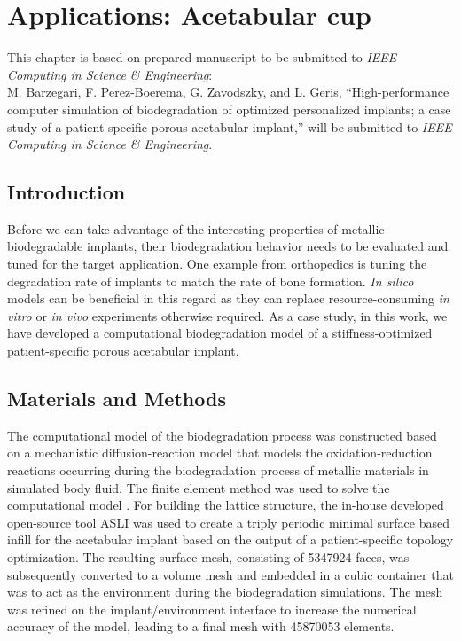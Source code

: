 \chapter{Applications: Acetabular cup}\label{ch:cup}

\begin{shaded}
This chapter is based on prepared manuscript to be submitted to  \textit{IEEE Computing in Science \& Engineering}:\\
M. Barzegari, F. Perez-Boerema, G. Zavodszky, and L. Geris, ``High-performance computer simulation of biodegradation of optimized personalized implants; a case study of a patient-specific porous acetabular implant,'' will be submitted to \textit{IEEE Computing in Science \& Engineering}.
\end{shaded}

\section{Introduction}

Before we can take advantage of the interesting properties of metallic biodegradable implants, their biodegradation behavior needs to be evaluated and tuned for the target application. One example from orthopedics is tuning the degradation rate of implants to match the rate of bone formation. \textit{In silico} models can be beneficial in this regard as they can replace resource-consuming \textit{in vitro} or \textit{in vivo }experiments otherwise required. As a case study, in this work, we have developed a computational biodegradation model of a stiffness-optimized patient-specific porous acetabular implant.

\section{Materials and Methods}

The computational model of the biodegradation process was constructed based on a mechanistic diffusion-reaction model that models the oxidation-reduction reactions occurring during the biodegradation process of metallic materials in simulated body fluid. The finite element method was used to solve the computational model \cite{Barzegari2021}. For building the lattice structure, the in-house developed open-source tool ASLI \cite{Perez-Boerema2022} was used to create a triply periodic minimal surface based infill for the acetabular implant based on the output of a patient-specific topology optimization. The resulting surface mesh, consisting of \num{5347924} faces, was subsequently converted to a volume mesh and embedded in a cubic container that was to act as the environment during the biodegradation simulations. The mesh was refined on the implant/environment interface to increase the numerical accuracy of the model, leading to a final mesh with \num{45870053} elements.

